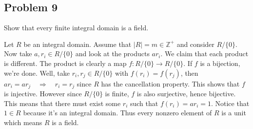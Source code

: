 \documentclass[../hw_sols.tex]{subfiles}
\begin{document}
\newpage



\subsection*{Problem 9}

Show that every finite integral domain is a field.

\begin{solution}
Let $R$ be an integral domain. Assume that $|R| = m \in \mathbb{Z}^+$ and 
consider $R/\{0\}$. Now take $a,r_i \in R/\{0\}$ and look at the products 
$ar_i$. We claim that each product is different. The product is clearly a map 
$f: R/\{0\} \to R/\{0\}$. If $f$ is a bijection, we're done. Well, take 
$r_i, r_j \in R/\{0\}$ with $f(r_i) = f(r_j)$, then 
$ar_i = ar_j \quad \Rightarrow \quad r_i = r_j$ since $R$ has the cancellation 
property. This shows that $f$ is injective. However since $R/\{0\}$ is finite, 
$f$ is also surjective, hence bijective. This means that there must exist some 
$r_i$ such that $f(r_i) = ar_i = 1$. Notice that $1 \in R$ because it's an 
integral domain. Thus every nonzero element of $R$ is a unit which means $R$ 
is a field.
\end{solution}
\end{document}
